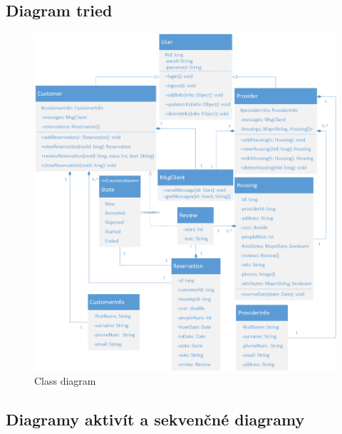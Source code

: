 \newpage

\subsection{Diagram tried}

\begin{figure}[!htbp]
    \centering
    \includegraphics[width=\linewidth]{img/class_diagram.png}
    \caption{Class diagram}
    \label{class_diagram}
\end{figure}

\newpage

\subsection{Diagramy aktivít a sekvenčné diagramy}

